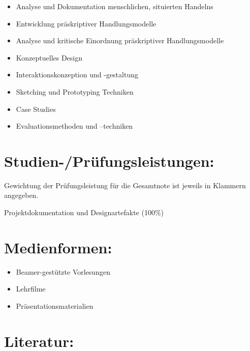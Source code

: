 \begin{itemize}
\tightlist
\item
  Analyse und Dokumentation menschlichen, situierten Handelns
\item
  Entwicklung präskriptiver Handlungsmodelle
\item
  Analyse und kritische Einordnung präskriptiver Handlungsmodelle
\item
  Konzeptuelles Design
\item
  Interaktionskonzeption und -gestaltung
\item
  Sketching und Prototyping Techniken
\item
  Case Studies
\item
  Evaluationsmethoden und --techniken
\end{itemize}

\section*{Studien-/Prüfungsleistungen:}\label{studien-pruxfcfungsleistungen-5}

Gewichtung der Prüfungsleistung für die Gesamtnote ist jeweils in
Klammern angegeben.

Projektdokumentation und Designartefakte (100\%)

\section*{Medienformen:}\label{medienformen-5}

\begin{itemize}
\tightlist
\item
  Beamer-gestützte Vorlesungen
\item
  Lehrfilme
\item
  Präsentationsmaterialien
\end{itemize}

\section*{Literatur:}\label{literatur-5}

